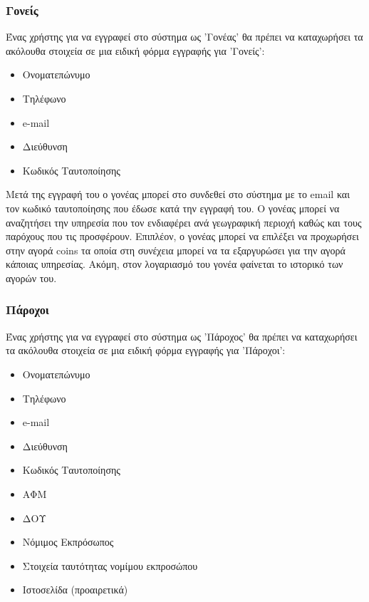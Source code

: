 \documentclass[letterpaper,6pt]{article}
\begin{document}
\subsubsection{Γονείς}
Ένας χρήστης για να εγγραφεί στο σύστημα ως 'Γονέας' θα πρέπει να καταχωρήσει τα ακόλουθα στοιχεία σε μια ειδική φόρμα εγγραφής για 'Γονείς':
\begin{itemize}
  \item Ονοματεπώνυμο
  \item Τηλέφωνο
  \item e-mail
  \item Διεύθυνση
  \item Κωδικός Ταυτοποίησης
\end{itemize}
Μετά της εγγραφή του ο γονέας μπορεί στο συνδεθεί στο σύστημα με το email και τον κωδικό ταυτοποίησης που έδωσε κατά την εγγραφή του. Ο γονέας μπορεί να αναζητήσει την υπηρεσία που τον ενδιαφέρει ανά γεωγραφική περιοχή καθώς και τους παρόχους που τις προσφέρουν. Επιπλέον, ο γονέας μπορεί να επιλέξει να προχωρήσει στην αγορά coins τα οποία στη συνέχεια μπορεί να τα εξαργυρώσει για την αγορά κάποιας υπηρεσίας. Ακόμη, στον λογαριασμό του γονέα φαίνεται το ιστορικό των αγορών του. 
\subsubsection{Πάροχοι}
Ένας χρήστης για να εγγραφεί στο σύστημα ως 'Πάροχος' θα πρέπει να καταχωρήσει τα ακόλουθα στοιχεία σε μια ειδική φόρμα εγγραφής για 'Πάροχοι':
\begin{itemize}
  \item Ονοματεπώνυμο
  \item Τηλέφωνο
  \item e-mail
  \item Διεύθυνση
  \item Κωδικός Ταυτοποίησης
  \item ΑΦΜ
  \item ΔΟΥ
  \item Νόμιμος Εκπρόσωπος
  \item Στοιχεία ταυτότητας νομίμου εκπροσώπου
  \item Ιστοσελίδα (προαιρετικά)
\end{itemize}
\end{document}
